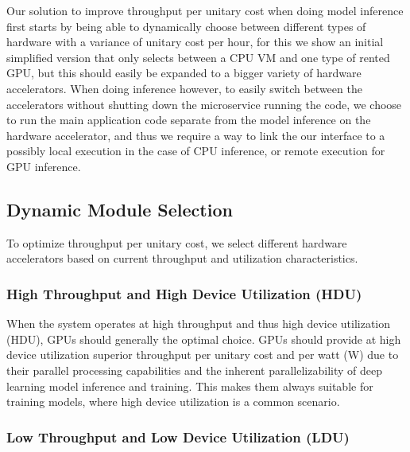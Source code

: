 \label{chap:implement}

\acresetall

\label{solution}

Our solution to improve throughput per unitary cost when doing model inference first starts by being able to dynamically choose between different types of hardware with a variance of unitary cost per hour, for this we show an initial simplified version that only selects between a CPU VM and one type of rented GPU, but this should easily be expanded to a bigger variety of hardware accelerators. When doing inference however, to easily switch between the accelerators without shutting down the microservice running the code, we choose to run the main application code separate from the model inference on the hardware accelerator, and thus we require a way to link the our interface to a possibly local execution in the case of CPU inference, or remote execution for GPU inference.

\subsection{Dynamic Module Selection}

To optimize throughput per unitary cost, we select different hardware accelerators based on current throughput and utilization characteristics.

\subsubsection{High Throughput and High Device Utilization (HDU)}

When the system operates at high throughput and thus high device utilization (HDU), GPUs should generally the optimal choice. GPUs should provide at high device utilization superior throughput per unitary cost and per watt (W) due to their parallel processing capabilities and the inherent parallelizability of deep learning model inference and training.
This makes them always suitable for training models, where high device utilization is a common scenario.

\subsubsection{Low Throughput and Low Device Utilization (LDU)}

